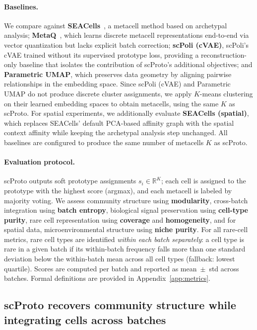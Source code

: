 \paragraph{Baselines.}
We compare against \textbf{SEACells}~\citep{seacells}, a metacell method based on archetypal analysis;
\textbf{MetaQ}~\citep{metaq}, which learns discrete metacell representations end-to-end via vector quantization but lacks explicit batch correction;
\textbf{scPoli (cVAE)}, scPoli's cVAE trained without its supervised prototype loss, providing a reconstruction-only baseline that isolates the contribution of scProto's additional objectives;
and \textbf{Parametric UMAP}, which preserves data geometry by aligning pairwise relationships in the embedding space.
Since scPoli (cVAE) and Parametric UMAP do not produce discrete cluster assignments, we apply $K$-means clustering on their learned embedding spaces to obtain metacells, using the same $K$ as scProto.
For spatial experiments, we additionally evaluate \textbf{SEACells (spatial)}, which replaces SEACells' default PCA-based affinity graph with the spatial context affinity while keeping the archetypal analysis step unchanged.
All baselines are configured to produce the same number of metacells $K$ as scProto.

\paragraph{Evaluation protocol.}
scProto outputs soft prototype assignments $s_i \in \mathbb{R}^K$; each cell is assigned to the prototype with the highest score (argmax), and each metacell is labeled by majority voting.
We assess community structure using \textbf{modularity}, cross-batch integration using \textbf{batch entropy}, biological signal preservation using \textbf{cell-type purity}, rare cell representation using \textbf{coverage} and \textbf{homogeneity}, and for spatial data, microenvironmental structure using \textbf{niche purity}.
For all rare-cell metrics, rare cell types are identified \emph{within each batch separately}: a cell type is rare in a given batch if its within-batch frequency falls more than one standard deviation below the within-batch mean across all cell types (fallback: lowest quartile).
Scores are computed per batch and reported as mean~$\pm$~std across batches.
Formal definitions are provided in Appendix~\ref{app:metrics}.

\subsection{scProto recovers community structure while integrating cells across batches}

